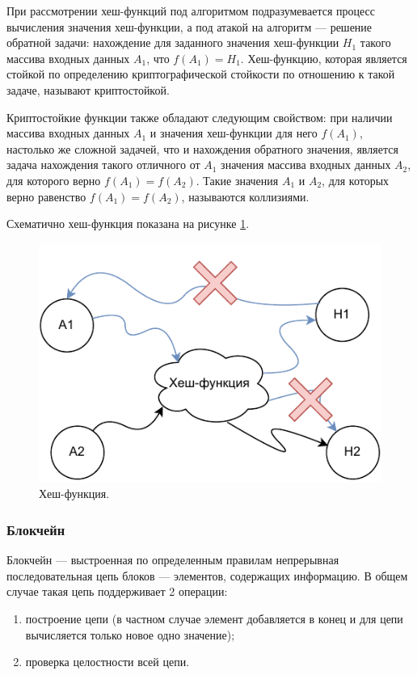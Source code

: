 При рассмотрении хеш-функций под алгоритмом подразумевается процесс вычисления значения хеш-функции, а под атакой на алгоритм --- решение обратной задачи: нахождение для заданного значения хеш-функции $H_1$ такого массива входных данных $A_1$, что $f(A_1) = H_1$. Хеш-функцию, которая является стойкой по определению криптографической стойкости по отношению к такой задаче, называют криптостойкой.

Криптостойкие функции также обладают следующим свойством: при наличии массива входных данных $A_1$ и значения хеш-функции для него $f(A_1)$, настолько же сложной задачей, что и нахождения обратного значения, является задача нахождения такого отличного от $A_1$ значения массива входных данных $A_2$, для которого верно $f(A_1) = f(A_2)$. Такие значения $A_1$ и $A_2$, для которых верно равенство $f(A_1) = f(A_2)$, называются коллизиями.

Схематично хеш-функция показана на рисунке \ref{fig:hashfunction}.

\begin{figure}[hbtp]
	\centering
	\includegraphics[scale=1]{img/hash-func.pdf}
	\caption{Хеш-функция.}
	\label{fig:hashfunction}
\end{figure}

\subsubsection{Блокчейн}

Блокчейн --- выстроенная по определенным правилам непрерывная последовательная цепь блоков --- элементов, содержащих информацию. \cite{bitcoin} В общем случае такая цепь поддерживает 2 операции:
\begin{enumerate}
    \item построение цепи (в частном случае элемент добавляется в конец и для цепи вычисляется только новое одно значение);
	\item проверка целостности всей цепи.
\end{enumerate}


